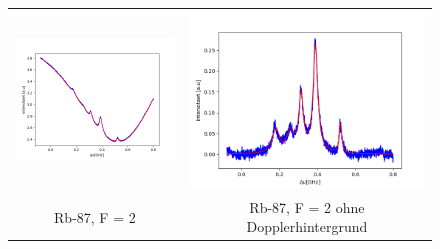 \documentclass[a4paper,parskip]{scrartcl}
\begin{document}
\begin{figure}[p]
\centering
\begin{tabular}{cc}
    \includegraphics[scale = 0.45]{./saturation/peak1/fit.png}  &  \includegraphics[scale = 0.45]{./saturation/peak1/gaussCorrected.png}  \\
    {\footnotesize Rb-87, F = 2} & {\footnotesize Rb-87, F = 2 ohne Dopplerhintergrund}  \\

\end{tabular}
\end{figure}
\end{document}
